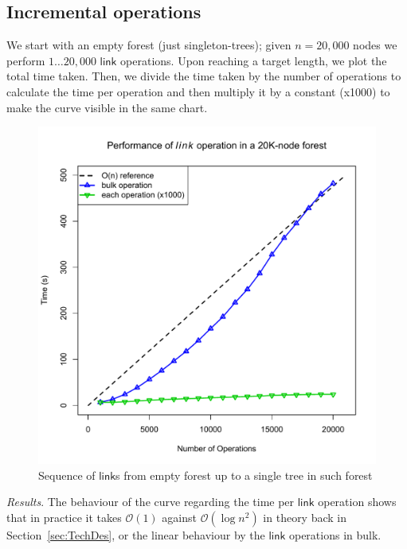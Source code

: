\documentclass{elsarticle}
\newcommand{\MATHSF}[1]{\ensuremath{\mathsf{#1}}\xspace}
\newcommand{\link}{\MATHSF{link}}
\renewcommand{\O}{\ensuremath{\mathcal{O}}}
\begin{document}
\subsection{Incremental operations} 
We start with an empty forest (just singleton-trees); given $n=20,000$ nodes we perform $1 \ldots 20,000$ \link operations. Upon reaching a target length, we plot the total time taken. Then, we divide the time taken by the number of operations to calculate the time per operation and then multiply it by a constant (x1000) to make the curve visible in the same chart.

\begin{figure}[H]
\begin{center}
\includegraphics[scale=0.4]{./Images/plotLink} 
\end{center}
\caption{Sequence of {\link}s from empty forest up to a single tree in such forest}
\label{fig:incLink}
\end{figure}

\textit{\emph{Results}}. The behaviour of the curve regarding the time per \link operation shows that in practice it takes $\O(1)$ against $\O(\log n^2)$ in theory back in Section~\ref{sec:TechDes}, or the linear behaviour by the \link operations in bulk.
\end{document}
